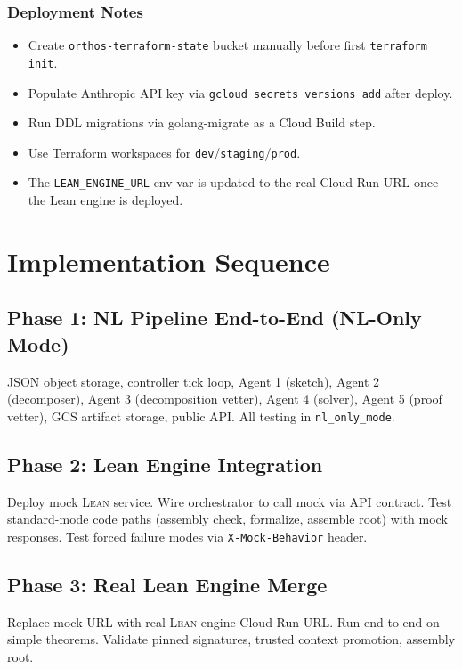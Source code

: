 \documentclass[11pt,a4paper]{article}
\newcommand{\Lean}{\textsc{Lean}}
\begin{document}
\subsubsection{Deployment Notes}
\begin{itemize}[leftmargin=2em]
  \item Create \texttt{orthos-terraform-state} bucket manually before first \texttt{terraform init}.
  \item Populate Anthropic API key via \texttt{gcloud secrets versions add} after deploy.
  \item Run DDL migrations via golang-migrate as a Cloud Build step.
  \item Use Terraform workspaces for \texttt{dev}/\texttt{staging}/\texttt{prod}.
  \item The \texttt{LEAN\_ENGINE\_URL} env var is updated to the real Cloud Run URL once the Lean engine is deployed.
\end{itemize}

\section{Implementation Sequence}

\subsection{Phase 1: NL Pipeline End-to-End (NL-Only Mode)}
JSON object storage, controller tick loop, Agent 1 (sketch), Agent 2 (decomposer), Agent 3 (decomposition vetter), Agent 4 (solver), Agent 5 (proof vetter), GCS artifact storage, public API. All testing in \texttt{nl\_only\_mode}.

\subsection{Phase 2: Lean Engine Integration}
Deploy mock \Lean{} service. Wire orchestrator to call mock via API contract. Test standard-mode code paths (assembly check, formalize, assemble root) with mock responses. Test forced failure modes via \texttt{X-Mock-Behavior} header.

\subsection{Phase 3: Real Lean Engine Merge}
Replace mock URL with real \Lean{} engine Cloud Run URL. Run end-to-end on simple theorems. Validate pinned signatures, trusted context promotion, assembly root.
\end{document}
